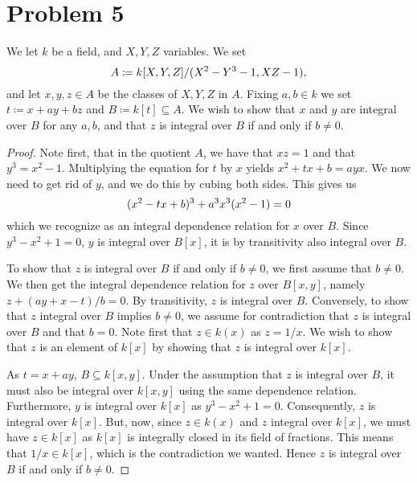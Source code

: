 \documentclass{article}
\begin{document}
\section*{Problem 5}
We let $k$ be a field, and $X, Y, Z$ variables. We set
\begin{equation}
    \notag
    A \coloneqq k[X, Y, Z] / (X^2- Y^3 - 1, XZ - 1), 
\end{equation}
and let $x, y, z \in A$ be the classes of $X, Y, Z$ in $A$. Fixing $a, b \in k$
we set $t \coloneqq x + ay + bz$ and $B \coloneqq k[t] \subseteq A$. We wish to
show that $x$ and $y$ are integral over $B$ for any $a, b$, and that $z$ is
integral over $B$ if and only if $b \neq 0$.

\begin{proof}
    Note first, that in the quotient $A$, we have that $xz = 1$ and that $y^3 =
    x^2 - 1$. Multiplying the equation for $t$ by $x$ yields $x^2 + tx + b =
    ayx$. We now need to get rid of $y$, and we do this by cubing both sides.
    This gives us
    \begin{equation}
        \notag
        (x^2 - tx + b)^3 + a^3x^3(x^2 - 1) = 0
    \end{equation}
    which we recognize as an integral dependence relation for $x$ over $B$.
    Since $y^3 - x^2 + 1 = 0$, $y$ is integral over $B[x]$, it is by
    transitivity also integral over $B$. 

    To show that $z$ is integral over $B$ if and only if $b \neq 0$, we first
    assume that $b\neq 0$. We then get the integral dependence relation for $z$
    over $B[x, y]$, namely $z + (a y + x - t) / b = 0$. By transitivity, $z$ is
    integral over $B$. Conversely, to show that $z$ integral over $B$ implies
    $b \neq 0$, we assume for contradiction that $z$ is integral over $B$ and
    that $b = 0$. Note first that $z \in k(x)$ as $z = 1 / x$.  We wish to show
    that $z$ is an element of $k[x]$ by showing that $z$ is integral over
    $k[x]$. 

    As $t = x + ay$, $B \subseteq k[x, y]$. Under the assumption that $z$ is
    integral over $B$, it must also be integral over $k[x, y]$ using the same
    dependence relation.  Furthermore, $y$ is integral over $k[x]$ as $y^3 -
    x^2 + 1 = 0$.  Consequently, $z$ is integral over $k[x]$. But, now, since
    $z \in k(x)$ and $z$ integral over $k[x]$, we must have $z \in k[x]$ as
    $k[x]$ is integrally closed in its field of fractions. This means that $1 /
    x \in k[x]$, which is the contradiction we wanted. Hence $z$ is integral
    over $B$ if and only if $b \neq 0$.
\end{proof}     
\end{document}
